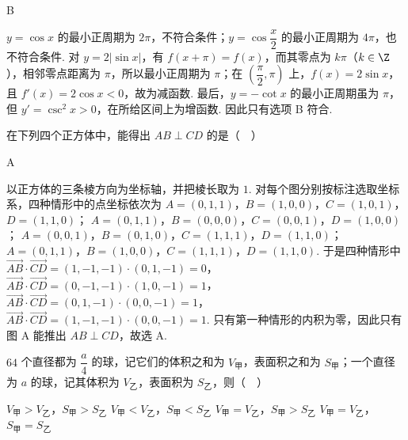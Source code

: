 \begin{answer}
B
\end{answer}

\begin{solution}
\(y=\cos x\) 的最小正周期为 \(2\pi\)，不符合条件；\(y=\cos\dfrac{x}{2}\) 的最小正周期为 \(4\pi\)，也不符合条件. 对 \(y=2\lvert\sin x\rvert\)，有 \(f(x+\pi)=f(x)\)，而其零点为 \(k\pi\)（\(k\in\Z\)），相邻零点距离为 \(\pi\)，所以最小正周期为 \(\pi\)；在 \(\left(\dfrac{\pi}{2},\pi\right)\) 上，\(f(x)=2\sin x\)，且 \(f'(x)=2\cos x<0\)，故为减函数. 最后，\(y=-\cot x\) 的最小正周期虽为 \(\pi\)，但 \(y'=\csc^2x>0\)，在所给区间上为增函数. 因此只有选项 B 符合.
\end{solution}

\begin{problem}
在下列四个正方体中，能得出 \(AB\perp CD\) 的是（\(\quad\)）

\choices
    {}
    {}
    {}
    {}
\end{problem}

\begin{answer}
A
\end{answer}

\begin{solution}
以正方体的三条棱方向为坐标轴，并把棱长取为 \(1\). 对每个图分别按标注选取坐标系，四种情形中的点坐标依次为
\(A=(0,1,1)\)，\(B=(1,0,0)\)，\(C=(1,0,1)\)，\(D=(1,1,0)\)；
\(A=(0,1,1)\)，\(B=(0,0,0)\)，\(C=(0,0,1)\)，\(D=(1,0,0)\)；
\(A=(0,0,1)\)，\(B=(0,1,0)\)，\(C=(1,1,1)\)，\(D=(1,1,0)\)；
\(A=(0,1,1)\)，\(B=(1,0,0)\)，\(C=(1,1,1)\)，\(D=(1,1,0)\).
于是四种情形中
\(\overrightarrow{AB}\cdot\overrightarrow{CD}=(1,-1,-1)\cdot(0,1,-1)=0\)，
\(\overrightarrow{AB}\cdot\overrightarrow{CD}=(0,-1,-1)\cdot(1,0,-1)=1\)，
\(\overrightarrow{AB}\cdot\overrightarrow{CD}=(0,1,-1)\cdot(0,0,-1)=1\)，
\(\overrightarrow{AB}\cdot\overrightarrow{CD}=(1,-1,-1)\cdot(0,0,-1)=1\).
只有第一种情形的内积为零，因此只有图 A 能推出 \(AB\perp CD\)，故选 A.
\end{solution}

\begin{problem}
\(64\) 个直径都为 \(\dfrac{a}{4}\) 的球，记它们的体积之和为 \(V_{\text{甲}}\)，表面积之和为 \(S_{\text{甲}}\)；一个直径为 \(a\) 的球，记其体积为 \(V_{\text{乙}}\)，表面积为 \(S_{\text{乙}}\)，则（\(\quad\)）

\choices
    {\(V_{\text{甲}}>V_{\text{乙}}\)，\(S_{\text{甲}}>S_{\text{乙}}\)}
    {\(V_{\text{甲}}<V_{\text{乙}}\)，\(S_{\text{甲}}<S_{\text{乙}}\)}
    {\(V_{\text{甲}}=V_{\text{乙}}\)，\(S_{\text{甲}}>S_{\text{乙}}\)}
    {\(V_{\text{甲}}=V_{\text{乙}}\)，\(S_{\text{甲}}=S_{\text{乙}}\)}
\end{problem}

